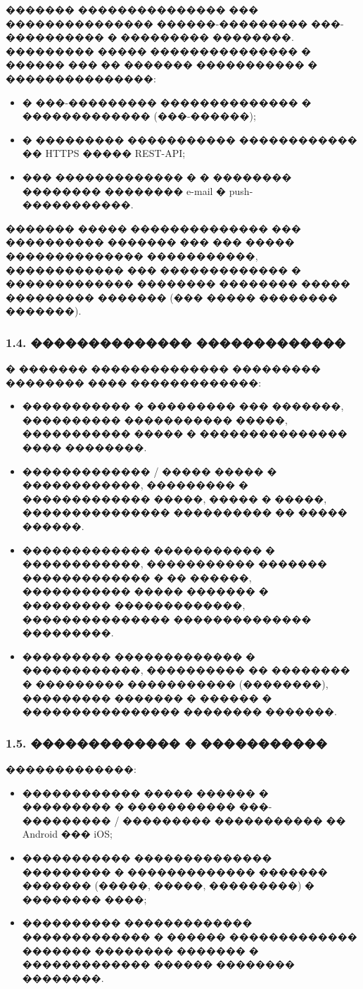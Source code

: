 \documentclass{G7-32}
\begin{document}
������� ��������������� ��� ��������������� ������-��������� ���-���������� � ��������� ��������. ��������� ����� ��������������� � ������ ��� �� ������� ����������� � ���������������:
\begin{itemize}
  \item � ���-��������� �������������� � ������������� (���-������);
  \item � ��������� ����������� ������������ �� HTTPS ����� REST-API;
  \item ��� ������������� � � �������� �������� �������� e-mail � push-�����������.
\end{itemize}

������� ����� �������������� ��� ���������� ������� ��� ��� ����� �������������� �����������, ������������ ��� ������������� � ������������� �������� �������� ����� ��������� ������� (��� ����� �������� �������).

\subsubsection*{1.4. �������������� �������������}

� ������� �������������� ��������� �������� ���� �������������:
\begin{itemize}
  \item ����������� � ��������� ��� �������, ���������� ����������� �����, ����������� ����� � ��������������� ���� ��������.
  \item ������������� / ����� ����� � ������������, ��������� � ������������� �����, ����� � �����, ��������������� ���������� �� ����� ������.
  \item ������������� ����������� � ������������, ����������� ������� ������������� � �� ������, ����������� ����� ������� � ��������� �������������, ��������������� �������������� ���������.
  \item ��������� ������������� � ������������, ���������� �� �������� � ��������� ����������� (��������), ��������� ������� � ������ � ���������������� �������� �������.
\end{itemize}

\subsubsection*{1.5. ������������� � �����������}

�������������:
\begin{itemize}
  \item ������������ ����� ������ � ��������� � ����������� ���-��������� / ��������� ����������� �� Android ��� iOS;
  \item ����������� �������������� ��������� � ������������� ������� ������� (�����, �����, ���������) � �������� ����;
  \item ���������� ������������� ������������� � ������ ������������� ������� �������� ������� � ������������� ������ �������� ��������.
\end{itemize}
\end{document}
